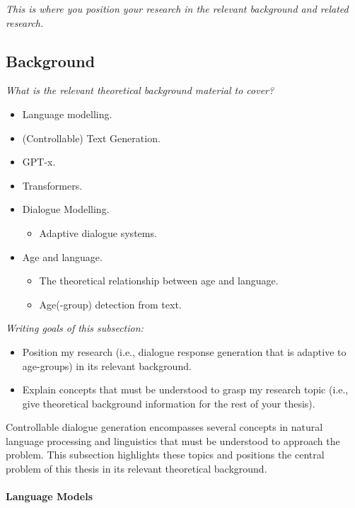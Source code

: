 \textit{This is where you position your research in the relevant background and related research.}

\subsection{Background}

\textit{What is the relevant theoretical background material to cover?}
\begin{itemize}
    \item Language modelling.
    \item (Controllable) Text Generation.
    \item GPT-x.
    \item Transformers.
    \item Dialogue Modelling.
    \begin{itemize}
        \item Adaptive dialogue systems.
    \end{itemize}
    \item Age and language.
    \begin{itemize}
        \item The theoretical relationship between age and language.
        \item Age(-group) detection from text.
    \end{itemize}
\end{itemize}

\textit{Writing goals of this subsection:}
\begin{itemize}
    \item Position my research (i.e., dialogue response generation that is adaptive to age-groups) in its relevant background.
    \item Explain concepts that must be understood to grasp my research topic (i.e., give theoretical background information for the rest of your thesis).
\end{itemize}

Controllable dialogue generation encompasses several concepts in natural language processing and linguistics that must be understood to approach the problem. This subsection highlights these topics and positions the central problem of this thesis in its relevant theoretical background.

\paragraph{Language Models}

